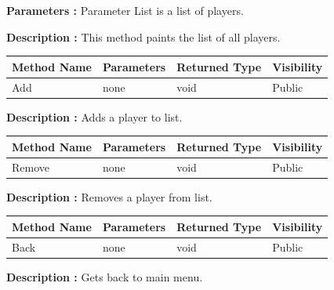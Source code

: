 \documentclass[12pt]{article}
\begin{document}
    \textbf{Parameters :} Parameter List is a list of players.

    \textbf{Description :} This method paints the list of all players.

    \begin{table}[H]
        \begin{tabular}{|l|l|l|l|}
            \hline
            \rowcolor[HTML]{EFEFEF}
            \cellcolor[HTML]{EFEFEF}\textbf{Method Name} & \textbf{Parameters} & \textbf{Returned Type} & \textbf{Visibility} \\ \hline
            Add                                          & none                & void                   & Public              \\ \hline
        \end{tabular}
    \end{table}

    \textbf{Description :} Adds a player to list.

    \begin{table}[H]
        \begin{tabular}{|l|l|l|l|}
            \hline
            \rowcolor[HTML]{EFEFEF}
            \cellcolor[HTML]{EFEFEF}\textbf{Method Name} & \textbf{Parameters} & \textbf{Returned Type} & \textbf{Visibility} \\ \hline
            Remove                                       & none                & void                   & Public              \\ \hline
        \end{tabular}
    \end{table}

    \textbf{Description :} Removes a player from list.

    \begin{table}[H]
        \begin{tabular}{|l|l|l|l|}
            \hline
            \rowcolor[HTML]{EFEFEF}
            \cellcolor[HTML]{EFEFEF}\textbf{Method Name} & \textbf{Parameters} & \textbf{Returned Type} & \textbf{Visibility} \\ \hline
            Back                                         & none                & void                   & Public              \\ \hline
        \end{tabular}
    \end{table}

    \textbf{Description :} Gets back to main menu.

    \newpage
\end{document}
